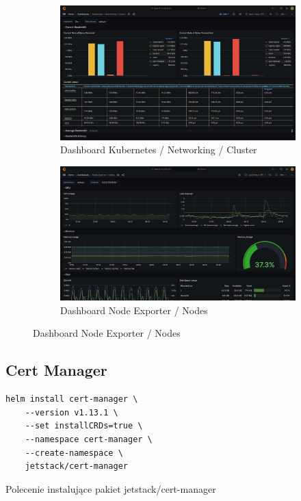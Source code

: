 \begin{figure}[p]
    \begin{figure}[H]
        \centering
        \includegraphics[width=\textwidth]{img/grafana-kubernetes-networking-cluster-dashboard}
        \caption{Dashboard Kubernetes / Networking / Cluster}
        \label{fig:grafana-kubernetes-networking-cluster-dashboard}
    \end{figure}

    \begin{figure}[H]
        \centering
        \includegraphics[width=\textwidth]{img/grafana-node-explorer-dashboard}
        \caption{Dashboard Node Exporter / Nodes}
        \label{fig:grafana-node-exlorer-dashboard}
    \end{figure}
\end{figure}

\subsection{Cert Manager}\label{subsec:cert-manager}

\begin{listing}[H]
    \begin{verbatim}
helm install cert-manager \
    --version v1.13.1 \
    --set installCRDs=true \
    --namespace cert-manager \
    --create-namespace \
    jetstack/cert-manager
    \end{verbatim}
    \caption{Polecenie instalujące pakiet jetstack/cert-manager}
    \label{lst:helm-install-cert-manager}
\end{listing}


